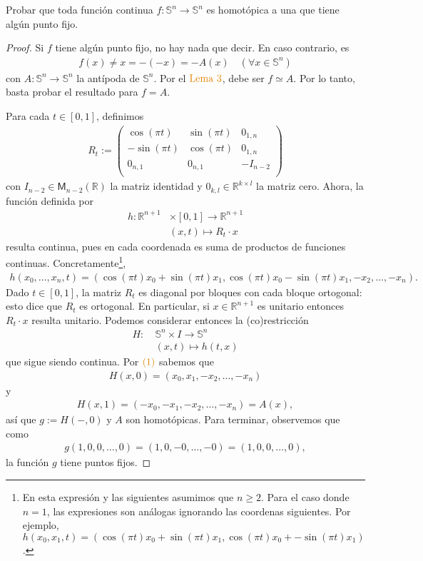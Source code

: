 \documentclass[11pt]{article}
\newcommand{\R}{\mathbb{R}}
\newcommand{\Ss}{\mathbb{S}}
\newcommand{\paint}[1]{\color{color}{#1}}
\newenvironment{exercise}[2][Ejercicio]{\begin{trivlist}
\item[\hskip \labelsep \paint{{\bfseries #1}}\hskip \labelsep {\bfseries #2.}]}{\end{trivlist}}
\begin{document}
\begin{exercise}{10} Probar que toda funci\'on continua $f : \Ss^n \to \Ss^n$ es homot\'opica a una que tiene alg\'un punto fijo.
\end{exercise}
\begin{proof} Si $f$ tiene alg\'un punto fijo, no hay nada que decir. En caso contrario, es
\begin{align*}
f(x) \neq x = -(-x) = -A(x) \quad  (\forall x \in \Ss^n)
\end{align*}
con $A : \Ss^n \to \Ss^n$ la ant\'ipoda de $\Ss^n$. Por el $\paint{\text{Lema $3$}}$, debe ser $f \simeq A$. Por lo tanto, basta probar el resultado para $f = A$. 

Para cada $t \in [0,1]$, definimos
\begin{align*}
R_t := \begin{pmatrix}
\cos(\pi t) & \sin(\pi t) & 0_{1,n}\\
-\sin(\pi t) & \cos(\pi t) & 0_{1,n}\\
0_{n,1} & 0_{n,1} & -I_{n-2}\\
\end{pmatrix}
\end{align*}
con $I_{n-2} \in \mathsf{M}_{n-2}(\R)$ la matriz identidad y $0_{k,l} \in \R^{k \times l}$ la matriz cero. Ahora, la funci\'on definida por
\begin{align*}
h : \R^{n+1}& \times [0,1] \to \mathbb{R}^{n+1}\\
&(x,t) \longmapsto R_t \cdot x
\end{align*}
resulta continua, pues en cada coordenada es suma de productos de funciones continuas. Concretamente\footnote{En esta expresi\'on y las siguientes asumimos que $n \geq 2$. Para el caso donde $n = 1$, las expresiones son an\'alogas ignorando las coordenas siguientes. Por ejemplo, $h(x_0,x_1,t) = (\cos(\pi t)x_0 + \sin(\pi t)x_1,\cos(\pi t)x_0+-\sin(\pi t)x_1)$.}, 
\begin{align}
h(x_0,\dots,x_n,t) = (\cos(\pi t)x_0 + \sin(\pi t)x_1,\cos(\pi t)x_0-\sin(\pi t)x_1,-x_2, \dots,-x_n).
\end{align}
Dado $t \in [0,1]$, la matriz $R_t$ es diagonal por bloques con cada bloque ortogonal: esto dice que $R_t$ es ortogonal. En particular, si $x \in \R^{n+1}$ es unitario entonces $R_t \cdot x$ resulta unitario. Podemos considerar entonces la (co)restricci\'on 
\begin{align*}
H : \ &\Ss^n \times I \to \Ss^n\\
&(x,t) \longmapsto h(t,x)
\end{align*}
que sigue siendo continua. Por $\paint{(1)}$ sabemos que
\begin{align*}
H(x,0) = (x_0,x_1,-x_2,\dots,-x_n)
\end{align*}
y
\begin{align*}
H(x,1) = (-x_0,-x_1,-x_2,\dots,-x_n) = A(x),
\end{align*}
as\'i que $g := H(-,0)$ y $A$ son homot\'opicas. Para terminar, observemos que como
\begin{align*}
g(1,0,0,\dots,0) = (1,0,-0,\dots,-0) = (1,0,0,\dots,0),
\end{align*}
la funci\'on $g$ tiene puntos fijos.
\end{proof}
\end{document}
